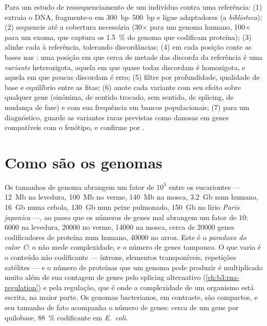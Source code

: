 \begin{method}\label{met:b3:genomics:pipeline}
Para um estudo de ressequenciamento de um indivíduo contra uma
referência: (1) extraia o DNA, fragmente-o em \qtyrange{300}{500}{bp}
e ligue adaptadores (a \emph{biblioteca}); (2) sequencie até a
cobertura necessária (30$\times$ para um genoma humano, 100$\times$
para um exoma, que captura os \qty{1.5}{\%} do genoma que codificam
proteína); (3) alinhe cada  à referência, tolerando
discordâncias; (4) em cada posição conte as bases nas : uma
posição em que cerca de metade das  discorda da referência é
uma \emph{variante} heterozigota, aquela em que quase todas discordam é
homozigota, e aquela em que poucas discordam é erro; (5) filtre por
profundidade, qualidade de base e equilíbrio entre as fitas; (6) anote
cada variante com seu efeito sobre qualquer gene (sinônima, de sentido
trocado, sem sentido, de splicing, de mudança de fase) e com sua
frequência em bancos populacionais; (7) para um diagnóstico, guarde as
variantes raras previstas como danosas em genes compatíveis com o
fenótipo, e confirme por .
\end{method}

\section{Como são os genomas}

\begin{proposition}\label{prop:b3:genomics:sizes}
Os tamanhos de genoma abrangem um fator de $10^{5}$ entre os
eucariontes --- \qty{12}{Mb} na levedura, \qty{100}{Mb} no verme,
\qty{140}{Mb} na mosca, \qty{3.2}{Gb} num humano, \qty{16}{Gb} numa
cebola, \qty{130}{Gb} num peixe pulmonado, \qty{150}{Gb} no lírio
\emph{Paris japonica} ---, ao passo que os números de genes mal
abrangem um fator de $10$: \num{6000} na levedura, \num{20000} no
verme, \num{14000} na mosca, cerca de \num{20000} genes codificadores
de proteína num humano, \num{40000} no arroz. Este é o \emph{paradoxo
do valor C}: o  não mede complexidade, e o número de
genes tampouco. O que varia é o conteúdo não codificante --- íntrons,
elementos transponíveis, repetições satélites --- e o número de
proteínas que um genoma pode produzir é multiplicado muito além de sua
contagem de genes pelo splicing alternativo
(\cref{ch:b3:rna-regulation}) e pela regulação, que é onde a
complexidade de um organismo está escrita, na maior parte. Os genomas
bacterianos, em contraste, são compactos, e seu tamanho de fato
acompanha o número de genes: cerca de um gene por quilobase,
\qty{88}{\%} codificante em \emph{E.~coli}.
\end{proposition}

